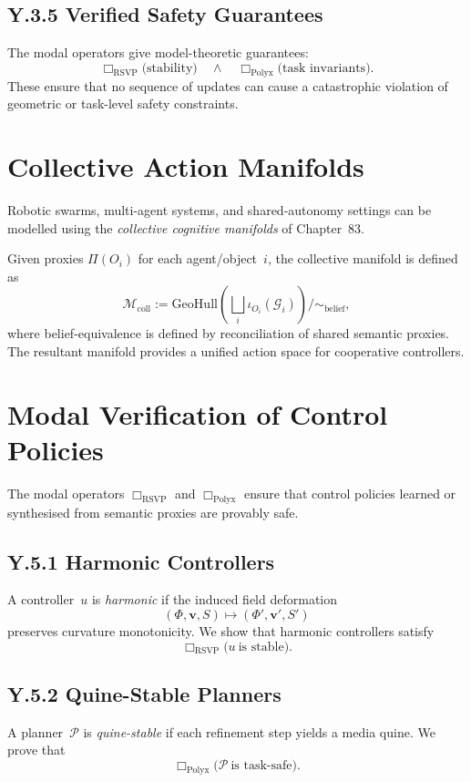 \subsection{Y.3.5 Verified Safety Guarantees}
The modal operators give model-theoretic guarantees:
\[
\Box_{\mathrm{RSVP}}\text{(stability)} \quad\wedge\quad
\Box_{\mathrm{Polyx}}\text{(task invariants)}.
\]
These ensure that no sequence of updates can cause a catastrophic violation
of geometric or task-level safety constraints.


\section{Collective Action Manifolds}
\label{sec:Y4}

Robotic swarms, multi-agent systems, and shared-autonomy settings can be
modelled using the \emph{collective cognitive manifolds} of Chapter~83.

Given proxies $\Pi(O_i)$ for each agent/object~$i$, the collective manifold is
defined as
\[
\mathcal{M}_{\mathrm{coll}} := 
\mathrm{GeoHull}\!\left(\bigsqcup_i \iota_{O_i}(\mathcal{G}_i)\right)\big/\!\sim_{\mathrm{belief}},
\]
where belief-equivalence is defined by reconciliation of shared semantic
proxies.  
The resultant manifold provides a unified action space for cooperative
controllers.


\section{Modal Verification of Control Policies}
\label{sec:Y5}

The modal operators $\Box_{\mathrm{RSVP}}$ and $\Box_{\mathrm{Polyx}}$ ensure
that control policies learned or synthesised from semantic proxies are provably
safe.

\subsection{Y.5.1 Harmonic Controllers}
A controller~$u$ is \emph{harmonic} if the induced field deformation
\[
(\Phi,\mathbf{v},S)\mapsto(\Phi',\mathbf{v}',S')
\]
preserves curvature monotonicity.  
We show that harmonic controllers satisfy
\[
\Box_{\mathrm{RSVP}}\bigl(u\ \text{is stable}\bigr).
\]

\subsection{Y.5.2 Quine-Stable Planners}
A planner~$\mathcal{P}$ is \emph{quine-stable} if each refinement step yields a
media quine.  
We prove that
\[
\Box_{\mathrm{Polyx}}\bigl(\mathcal{P}\ \text{is task-safe}\bigr).
\]

